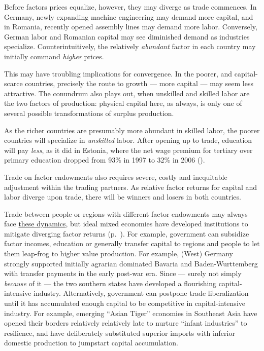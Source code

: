 Before factors prices equalize, however, they may diverge as trade commences.
In Germany, newly expanding machine engineering may demand more capital, and in Romania, recently opened assembly lines may demand more labor.
Conversely, German labor and Romanian capital may see diminished demand as industries specialize.
Counterintuitively, the relatively \emph{abundant} factor in each country may initially command \emph{higher} prices.

This may have troubling implications for convergence.
In the poorer, and capital-scarce countries, precisely the route to growth --- more capital --- may seem less attractive.
The conundrum also plays out, when unskilled and skilled labor are the two factors of production:
physical capital here, as always, is only one of several possible transformations of surplus production.

As the richer countries are presumably more abundant in skilled labor, the poorer countries will specialize in \emph{unskilled} labor.
After opening up to trade, education will pay \emph{less}, as it did in Estonia, where the net wage premium for tertiary over primary education dropped from 93\% in 1997 to 32\% in 2006 (\citealt[33]{Piatkowski2008}).


Trade on factor endowments also requires severe, costly and inequitable adjustment within the trading partners.
As relative factor returns for capital and labor diverge upon trade, there will be winners and losers in both countries.

Trade between people or regions with different factor endowments may always face \hyperref[sec:space]{these dynamics}, but ideal mixed economies have developed institutions to mitigate diverging factor returns (p.~\pageref{sec:space}).
For example, government can subsidize factor incomes, education or generally transfer capital to regions and people to let them leap-frog to higher value production.
For example, (West) Germany strongly supported initially agrarian dominated Bavaria and Baden-Wurttemberg with transfer payments in the early post-war era.
Since --- surely not simply \emph{because} of it --- the two southern states have developed a flourishing capital-intensive industry.
Alternatively, government can postpone trade liberalization until it has accumulated enough capital to be competitive in capital-intensive industry.
For example, emerging ``Asian Tiger'' economies in Southeast Asia have opened their borders relatively relatively late to nurture ``infant industries'' to resilience, and have deliberately substituted superior imports with inferior domestic production to jumpstart capital accumulation.

